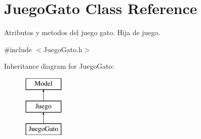 \hypertarget{class_juego_gato}{}\section{Juego\+Gato Class Reference}
\label{class_juego_gato}


Atributos y metodos del juego gato. Hija de juego.  




{\ttfamily \#include $<$Juego\+Gato.\+h$>$}

Inheritance diagram for Juego\+Gato\+:\begin{figure}[H]
\begin{center}
\leavevmode
\includegraphics[height=3.000000cm]{class_juego_gato}
\end{center}
\end{figure}
